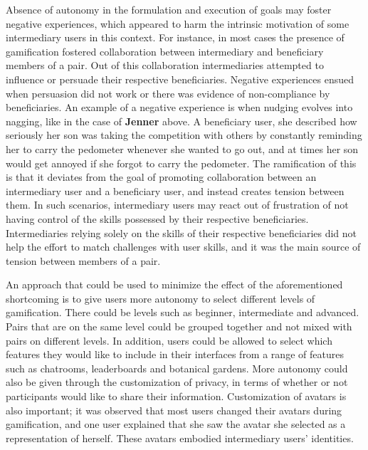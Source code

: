 Absence of autonomy in the formulation and execution of goals may foster  negative experiences, which appeared to harm the intrinsic motivation of some intermediary users in this context. For instance, in most cases the presence of gamification fostered collaboration between intermediary and beneficiary members of a pair. Out of this collaboration intermediaries attempted to influence or persuade their respective beneficiaries. Negative experiences ensued when persuasion did not work or there was evidence of non-compliance by beneficiaries. An example of a negative experience is when nudging evolves into nagging, like in the case of \textbf{Jenner} above. A beneficiary user, she described how seriously her son was taking the competition with others by constantly reminding her to carry the pedometer whenever she wanted to go out, and at times her son would get annoyed if she forgot to carry the pedometer. The ramification of this is that it deviates from the goal of promoting collaboration between an intermediary user and a beneficiary user, and instead creates tension between them. In such scenarios, intermediary users may react out of frustration of not having control of the skills possessed by their respective beneficiaries. Intermediaries relying solely on the skills of their respective beneficiaries did  not help the effort to match challenges with user skills, and it was the main source of tension between members of a pair. 

An approach that could be used to minimize the effect of the  aforementioned shortcoming is to give users more autonomy to select different levels of gamification. There could be levels such as beginner, intermediate and advanced. Pairs that are on the same level could be grouped together and not mixed with pairs on different levels. In addition, users could be allowed to select which features they would like to include in their interfaces from a range of features such as chatrooms, leaderboards and botanical gardens. More autonomy could also be given through the customization of privacy, in terms of whether or not participants would like to share their information. Customization of avatars is also important; it was observed that most users changed their avatars during gamification, and one user explained that she saw the avatar she selected as a representation of herself. These avatars embodied intermediary users' identities.

